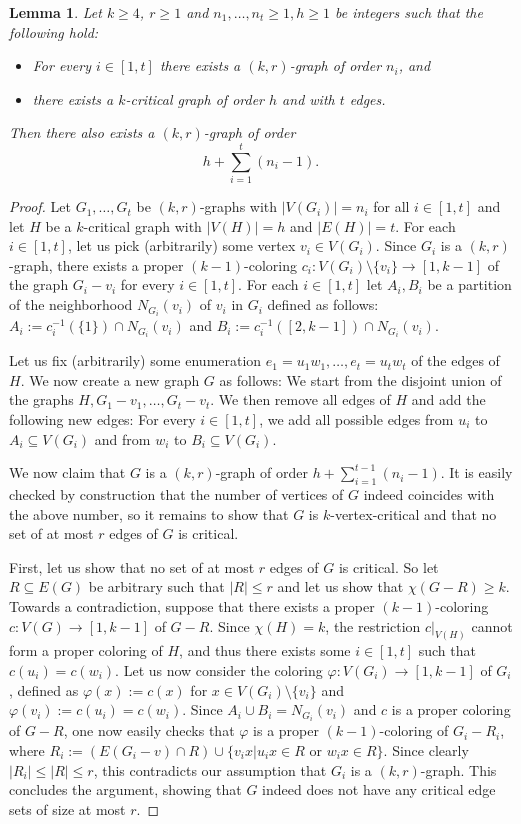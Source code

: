 \documentclass[a4paper,10pt,hidelinks]{amsart}
\renewcommand{\phi}{\ensuremath{\varphi}}
\newtheorem{lemma}[theorem]{Lemma}
\theoremstyle{definition}
\begin{document}
\begin{lemma}\label{lem:glue}
Let $k\ge 4$, $r\ge 1$ and $n_1,\ldots,n_t\ge 1, h\ge 1$ be integers such that the following hold:
\begin{itemize}
    \item For every $i\in [1,t]$ there exists a $(k,r)$-graph of order $n_i$, and
    \item there exists a $k$-critical graph of order $h$ and with $t$ edges.
\end{itemize}
Then there also exists a $(k,r)$-graph of order
$$h+\sum_{i=1}^{t}(n_i-1).$$
\end{lemma}
\begin{proof}
Let $G_1,\ldots,G_t$ be $(k,r)$-graphs with $|V(G_i)|=n_i$ for all $i\in [1,t]$ and let $H$ be a $k$-critical graph with $|V(H)|=h$ and $|E(H)|=t$. For each $i\in [1,t]$, let us pick (arbitrarily) some vertex $v_i\in V(G_i)$. Since $G_i$ is a $(k,r)$-graph, there exists a proper $(k-1)$-coloring $c_i:V(G_i)\setminus \{v_i\}\rightarrow [1,k-1]$ of the graph $G_i-v_i$ for every $i\in [1,t]$. For each $i\in [1,t]$ let $A_i, B_i$ be a partition of the neighborhood $N_{G_i}(v_i)$ of $v_i$ in $G_i$ defined as follows: $A_i:=c_i^{-1}(\{1\})\cap N_{G_i}(v_i)$ and $B_i:=c_i^{-1}([2,k-1])\cap N_{G_i}(v_i)$. 

Let us fix (arbitrarily) some enumeration $e_1=u_1w_1,\ldots,e_t=u_tw_t$ of the edges of $H$. We now create a new graph $G$ as follows: We start from the disjoint union of the graphs $H, G_1-v_1,\ldots, G_t-v_t$. We then remove all edges of $H$ and add the following new edges: For every $i\in [1,t]$, we add all possible edges from $u_i$ to $A_i\subseteq V(G_i)$ and from $w_i$ to $B_i\subseteq V(G_i)$. 

We now claim that $G$ is a $(k,r)$-graph of order $h+\sum_{i=1}^{t-1}(n_i-1)$. It is easily checked by construction that the number of vertices of $G$ indeed coincides with the above number, so it remains to show that $G$ is $k$-vertex-critical and that no set of at most $r$ edges of $G$ is critical. 

First, let us show that no set of at most $r$ edges of $G$ is critical. So let $R\subseteq E(G)$ be arbitrary such that $|R|\le r$ and let us show that $\chi(G-R)\ge k$. Towards a contradiction, suppose that there exists a proper $(k-1)$-coloring $c:V(G)\rightarrow [1,k-1]$ of $G-R$. Since $\chi(H)=k$, the restriction $c|_{V(H)}$ cannot form a proper coloring of $H$, and thus there exists some $i\in [1,t]$ such that $c(u_i)=c(w_i)$. Let us now consider the coloring $\phi:V(G_i)\rightarrow [1,k-1]$ of $G_i$, defined as $\phi(x):=c(x)$ for $x\in V(G_i)\setminus \{v_i\}$ and $\phi(v_i):=c(u_i)=c(w_i)$. Since $A_i\cup B_i=N_{G_i}(v_i)$ and $c$ is a proper coloring of $G-R$, one now easily checks that $\phi$ is a proper $(k-1)$-coloring of $G_i-R_i$, where $R_i:=(E(G_i-v)\cap R)\cup \{v_ix|u_ix\in R \text{ or }w_ix\in R\}$. Since clearly $|R_i|\le |R|\le r$, this contradicts our assumption that $G_i$ is a $(k,r)$-graph. This concludes the argument, showing that $G$ indeed does not have any critical edge sets of size at most $r$. 


\end{proof}
\end{document}
